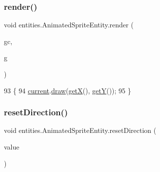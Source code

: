 \subsubsection{\texorpdfstring{render()}{render()}}
{\footnotesize\ttfamily void entities.\+Animated\+Sprite\+Entity.\+render (\begin{DoxyParamCaption}\item[{\mbox{\hyperlink{classorg_1_1newdawn_1_1slick_1_1_game_container}{Game\+Container}}}]{gc,  }\item[{\mbox{\hyperlink{classorg_1_1newdawn_1_1slick_1_1_graphics}{Graphics}}}]{g }\end{DoxyParamCaption})\hspace{0.3cm}{\ttfamily [inline]}}


\begin{DoxyCode}
93                                                      \{
94         \mbox{\hyperlink{classentities_1_1_animated_sprite_entity_ab44999a4be67c7ce81f4da6b5d333ce5}{current}}.\mbox{\hyperlink{classorg_1_1newdawn_1_1slick_1_1_animation_a7ff3b50dcc4c72c83ada402daa6fe5f3}{draw}}(\mbox{\hyperlink{classorg_1_1newdawn_1_1slick_1_1geom_1_1_shape_a736a47bfdd6f164558b43fd497a3a3f3}{getX}}(), \mbox{\hyperlink{classorg_1_1newdawn_1_1slick_1_1geom_1_1_shape_a5f334f962d8fc525d522fe0f8ac20b35}{getY}}());
95     \}
\end{DoxyCode}
\mbox{\label{classentities_1_1_animated_sprite_entity_aa0c03e8354889e4e8dd9caccf2c43d48}} 
\subsubsection{\texorpdfstring{reset\+Direction()}{resetDirection()}}
{\footnotesize\ttfamily void entities.\+Animated\+Sprite\+Entity.\+reset\+Direction (\begin{DoxyParamCaption}\item[{\mbox{\hyperlink{enumentities_1_1_direction}{Direction}}}]{value }\end{DoxyParamCaption})\hspace{0.3cm}{\ttfamily [inline]}}


